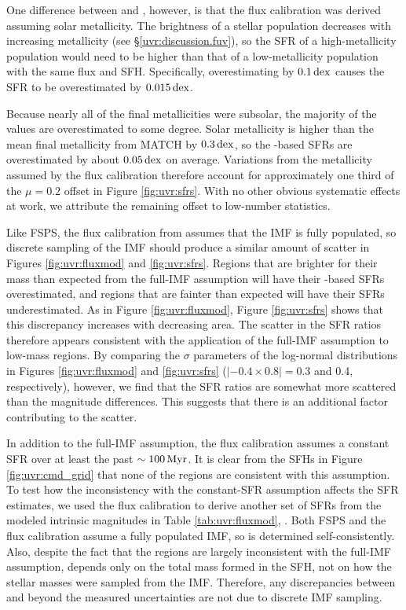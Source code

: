 One difference between \sfrfuv{} and \sfroneh{}, however, is that the \fuv{} flux calibration was
derived assuming solar metallicity. The \fuv{} brightness of a stellar population
decreases with increasing metallicity (see \S \ref{uvr:discussion.fuv}), so the SFR
of a high-metallicity population would need to be higher than that of a
low-metallicity population with the same \fuv{} flux and SFH. Specifically,
overestimating \met{} by $0.1\,\mathrm{dex}$ causes the SFR to be
overestimated by $0.015\,\mathrm{dex}$.

Because nearly all of the final metallicities were subsolar, the majority of
the \sfrfuv{} values are overestimated to some degree. Solar
metallicity is higher than the mean final metallicity from MATCH by
$0.3\,\mathrm{dex}$, so the \fuv{}-based SFRs are overestimated by about
$0.05\,\mathrm{dex}$ on average. Variations from the metallicity assumed by the
flux calibration therefore account for approximately one third of the $\mu=0.2$
offset in Figure \ref{fig:uvr:sfrs}. With no other obvious systematic effects at
work, we attribute the remaining offset to low-number statistics.

Like FSPS, the \fuv{} flux calibration from \citet{Kennicutt:1998} assumes that the
IMF is fully populated, so discrete sampling of the IMF should produce a
similar amount of scatter in Figures \ref{fig:uvr:fluxmod} and \ref{fig:uvr:sfrs}.
Regions that are brighter for their mass than expected from the full-IMF
assumption will have their \fuv{}-based SFRs overestimated, and regions that are
fainter than expected will have their SFRs underestimated. As in Figure
\ref{fig:uvr:fluxmod}, Figure \ref{fig:uvr:sfrs} shows that this discrepancy increases
with decreasing area. The scatter in the SFR ratios therefore appears
consistent with the application of the full-IMF assumption to low-mass regions.
By comparing the $\sigma$ parameters of the log-normal distributions in Figures
\ref{fig:uvr:fluxmod} and \ref{fig:uvr:sfrs} ($|-0.4 \times 0.8|=0.3$ and 0.4,
respectively), however, we find that the SFR ratios are somewhat more scattered
than the magnitude differences. This suggests that there is an additional
factor contributing to the scatter.

In addition to the full-IMF assumption, the \fuv{} flux calibration assumes a
constant SFR over at least the past $\sim 100\,\mathrm{Myr}$. It is clear from
the SFHs in Figure \ref{fig:uvr:cmd_grid} that none of the regions are consistent
with this assumption. To test how the inconsistency with the constant-SFR
assumption affects the SFR estimates, we used the \fuv{} flux calibration to
derive another set of SFRs from the modeled intrinsic magnitudes in Table
\ref{tab:uvr:fluxmod}, \sfrfuvz{}. Both FSPS and the flux calibration
assume a fully populated IMF, so \sfrfuvz{} is determined
self-consistently. Also, despite the fact that the regions are largely
inconsistent with the full-IMF assumption, \sfroneh{}
depends only on the total mass formed in the SFH, not on how the stellar masses
were sampled from the IMF. Therefore, any discrepancies between
\sfrfuvz{} and \sfroneh{} beyond the
measured uncertainties are not due to discrete IMF sampling.

